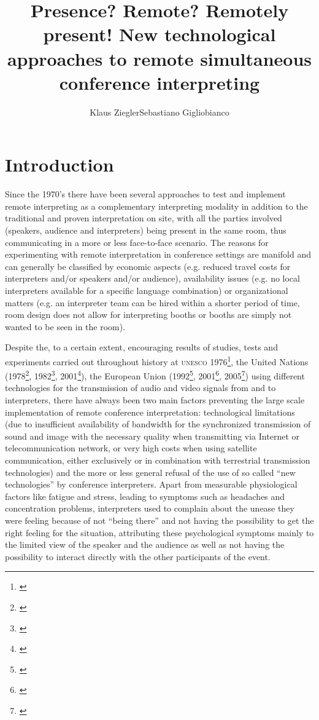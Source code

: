 \documentclass[output=paper]{langsci/langscibook}
\author{Klaus Ziegler\affiliation{AIIC Technical Committee}\lastand Sebastiano Gigliobianco\affiliation{SDI München}}
\title{Presence? Remote? Remotely present! New technological approaches to remote simultaneous conference interpreting}
\begin{document}
\section{Introduction}
\largerpage
\label{sec:ziegler:01}
Since the 1970’s there have been several approaches to test and implement remote interpreting as a complementary interpreting modality in addition to the traditional and proven interpretation on site, with all the parties involved (speakers, audience and interpreters) being present in the same room, thus communicating in a more or less face-to-face scenario. The reasons for experimenting with remote interpretation in conference settings are manifold and can generally be classified by economic aspects (e.g. reduced travel costs for interpreters and/or speakers and/or audience), availability issues (e.g. no local interpreters available for a specific language combination) or organizational matters (e.g. an interpreter team can be hired within a shorter period of time, room design does not allow for interpreting booths or booths are simply not wanted to be seen in the room). 

Despite the, to a certain extent, encouraging results of studies, tests and experiments carried out throughout history at \textsc{unesco} 1976\footnote{\citealt{Kurz2000}}, the United Nations (1978\footnote{\citealt{Chernov2004}}, 1982\footnote{\citet{UNESCO1987}}, 2001\footnote{\citealt{Mouzourakis2006}}), the European Union (1992\footnote{\citealt{Kurz2000}}, 2001\footnote{\citealt{Europarl2001}}, 2005\footnote{\citealt{Roziner2010}}) using different technologies for the transmission of audio and video signals from and to interpreters, there have always been two main factors preventing the large scale implementation of remote conference interpretation: technological limitations (due to insufficient availability of bandwidth for the synchronized transmission of sound and image with the necessary quality when transmitting via Internet or telecommunication network, or very high costs when using satellite communication, either exclusively or in combination with terrestrial transmission technologies) and the more or less general refusal of the use of so called “new technologies” by conference interpreters. Apart from measurable physiological factors like fatigue and stress, leading to symptoms such as headaches and concentration problems, interpreters used to complain about the unease they were feeling because of not “being there” \citep[56]{Mouzourakis2006} and not having the possibility to get the right feeling for the situation, attributing these psychological symptoms mainly to the limited view of the speaker and the audience as well as not having the possibility to interact directly with the other participants of the event.
\end{document}
